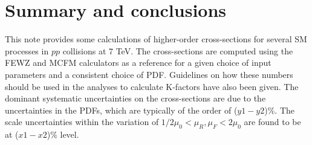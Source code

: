 \section{Summary and conclusions}
\label{sec:conclusion}
This note provides some calculations of higher-order cross-sections for 
several SM processes in $pp$ collisions at 7 TeV. The cross-sections are 
computed using the FEWZ and MCFM calculators as a reference for a given choice 
of input parameters and a consistent choice of PDF. Guidelines on how these
numbers should be used in the analyses to calculate K-factors have also 
been given. 
The dominant systematic uncertainties on the cross-sections are due to the 
uncertainties in the PDFs, which are typically of the order of ($y1-y2$)\%. 
The scale uncertainties within the variation 
of $1/2 \mu_0 < \mu_R, \mu_F < 2\mu_0$ are found to be at ($x1-x2$)\% level. 

